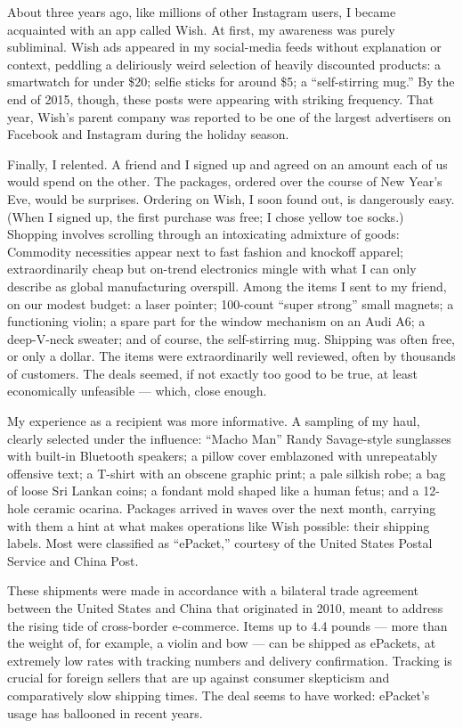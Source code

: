About three years ago, like millions of other Instagram users, I became
acquainted with an app called Wish. At first, my awareness was purely
subliminal. Wish ads appeared in my social-media feeds without
explanation or context, peddling a deliriously weird selection of
heavily discounted products: a smartwatch for under \$20; selfie sticks
for around \$5; a ``self-stirring mug.'' By the end of 2015, though,
these posts were appearing with striking frequency. That year, Wish's
parent company was reported to be one of the largest advertisers on
Facebook and Instagram during the holiday season.

Finally, I relented. A friend and I signed up and agreed on an amount
each of us would spend on the other. The packages, ordered over the
course of New Year's Eve, would be surprises. Ordering on Wish, I soon
found out, is dangerously easy. (When I signed up, the first purchase
was free; I chose yellow toe socks.) Shopping involves scrolling through
an intoxicating admixture of goods: Commodity necessities appear next to
fast fashion and knockoff apparel; extraordinarily cheap but on-trend
electronics mingle with what I can only describe as global manufacturing
overspill. Among the items I sent to my friend, on our modest budget: a
laser pointer; 100-count ``super strong'' small magnets; a functioning
violin; a spare part for the window mechanism on an Audi A6; a
deep-V-neck sweater; and of course, the self-stirring mug. Shipping was
often free, or only a dollar. The items were extraordinarily well
reviewed, often by thousands of customers. The deals seemed, if not
exactly too good to be true, at least economically unfeasible --- which,
close enough.

My experience as a recipient was more informative. A sampling of my
haul, clearly selected under the influence: ``Macho Man'' Randy
Savage-style sunglasses with built-in Bluetooth speakers; a pillow cover
emblazoned with unrepeatably offensive text; a T-shirt with an obscene
graphic print; a pale silkish robe; a bag of loose Sri Lankan coins; a
fondant mold shaped like a human fetus; and a 12-hole ceramic ocarina.
Packages arrived in waves over the next month, carrying with them a hint
at what makes operations like Wish possible: their shipping labels. Most
were classified as ``ePacket,'' courtesy of the United States Postal
Service and China Post.

These shipments were made in accordance with a bilateral trade agreement
between the United States and China that originated in 2010, meant to
address the rising tide of cross-border e-commerce. Items up to 4.4
pounds --- more than the weight of, for example, a violin and bow ---
can be shipped as ePackets, at extremely low rates with tracking numbers
and delivery confirmation. Tracking is crucial for foreign sellers that
are up against consumer skepticism and comparatively slow shipping
times. The deal seems to have worked: ePacket's usage has ballooned in
recent years.

